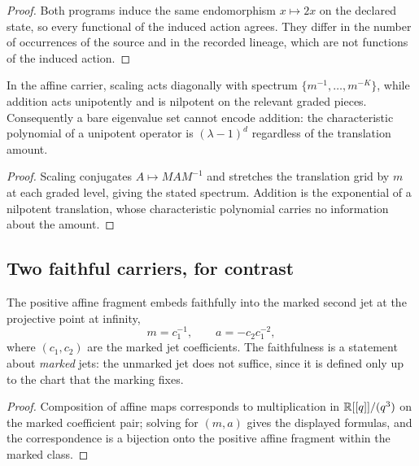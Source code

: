 \begin{proof}
Both programs induce the same endomorphism $x\mapsto 2x$ on the declared state, so every
functional of the induced action agrees.  They differ in the number of occurrences of
the source and in the recorded lineage, which are not functions of the induced action.
\end{proof}

\begin{proposition}
\label{prop:affine-spectrum}
In the affine carrier, scaling acts diagonally with spectrum
$\{m^{-1},\dots,m^{-K}\}$, while addition acts unipotently and is nilpotent on the
relevant graded pieces.  Consequently a bare eigenvalue set cannot encode addition: the
characteristic polynomial of a unipotent operator is $(\lambda-1)^{d}$ regardless of the
translation amount.
\end{proposition}

\begin{proof}
Scaling conjugates $A\mapsto M AM^{-1}$ and stretches the translation grid by $m$ at each
graded level, giving the stated spectrum.  Addition is the exponential of a nilpotent
translation, whose characteristic polynomial carries no information about the amount.
\end{proof}

\subsection{Two faithful carriers, for contrast}

\begin{theorem}\label{thm:second-jet}
The positive affine fragment embeds faithfully into the marked second jet at the
projective point at infinity,
\[
  m=c_1^{-1},\qquad a=-c_2c_1^{-2},
\]
where $(c_1,c_2)$ are the marked jet coefficients.  The faithfulness is a statement about
\emph{marked} jets: the unmarked jet does not suffice, since it is defined only up to the
chart that the marking fixes.
\end{theorem}

\begin{proof}
Composition of affine maps corresponds to multiplication in
$\mathbb{R}[[q]]/(q^{3})$ on the marked coefficient pair; solving for $(m,a)$ gives the displayed
formulas, and the correspondence is a bijection onto the positive affine fragment within
the marked class.
\end{proof}

